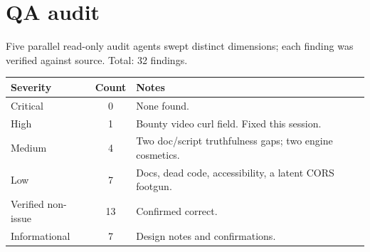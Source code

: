 \documentclass[11pt]{article}
\begin{document}
\section{QA audit}
Five parallel read-only audit agents swept distinct dimensions; each finding was verified against source. Total: 32 findings.

\begin{center}\small
\begin{tabular}{@{}lcl@{}}
\toprule
Severity & Count & Notes \\
\midrule
Critical & 0 & None found. \\
High & 1 & Bounty video curl field. Fixed this session. \\
Medium & 4 & Two doc/script truthfulness gaps; two engine cosmetics. \\
Low & 7 & Docs, dead code, accessibility, a latent CORS footgun. \\
Verified non-issue & 13 & Confirmed correct. \\
Informational & 7 & Design notes and confirmations. \\
\bottomrule
\end{tabular}
\end{center}
\end{document}
